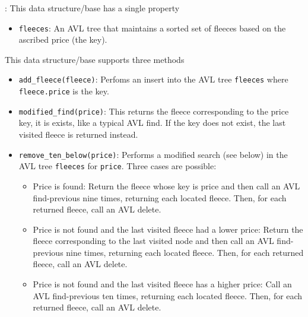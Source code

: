 \documentclass[12pt,twoside]{article}
\begin{document}
\begin{problems}
\begin{problemparts}
: This data structure/base has a single property
    \begin{itemize}
        \item {\tt fleeces}: An AVL tree that maintains a sorted set of
        fleeces based on the ascribed price (the key).
    \end{itemize}
    This data structure/base supports three methods
    \begin{itemize}
        \item {\tt add\_fleece(fleece)}: Perfoms an insert into the AVL tree
        {\tt fleeces} where {\tt fleece.price} is the key.
        \item {\tt modified\_find(price)}: This returns the fleece
        corresponding to the price key, it is exists, like a typical AVL
        find. If the key does not exist, the last visited fleece is returned
        instead.
        \item {\tt remove\_ten\_below(price)}: Performs a modified search
        (see below) in the AVL tree {\tt fleeces} for {\tt price}. Three
        cases are possible:
        \begin{itemize}
            \item Price is found: Return the fleece whose key is price and
            then call an AVL find-previous nine times, returning each located
            fleece. Then, for each returned fleece, call an AVL delete.
            \item Price is not found and the last visited fleece had a lower
            price: Return the fleece corresponding to the last visited node and
            then call an AVL find-previous nine times, returning each located
            fleece. Then, for each returned fleece, call an AVL delete.
            \item Price is not found and the last visited fleece has a higher
            price: Call an AVL find-previous ten times, returning each located
            fleece. Then, for each returned fleece, call an AVL delete.
        \end{itemize}
    \end{itemize}

    \smallbreak


\end{problemparts}
\end{problems}
\end{document}
